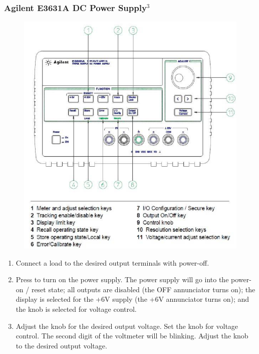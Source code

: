 \documentclass[12pt]{article}
\begin{document}
\subsubsection{Agilent E3631A DC Power Supply$^3$}
\begin{figure}[H]
\centering
\includegraphics[scale=0.5]{P2.jpg}
\end{figure}
\begin{enumerate}
\item Connect a load to the desired output terminals with power-off.
\item Press to turn on the power supply. The power supply will go into the power-on / reset state; all outputs are disabled (the OFF annunciator turns on); the display is selected for the +6V supply (the +6V annunciator turns on); and the knob is selected for voltage control.
\item Adjust the knob for the desired output voltage. Set the knob for voltage control. The second digit of the voltmeter will be blinking. Adjust the knob to the desired output voltage.
\end{enumerate}
\end{document}
